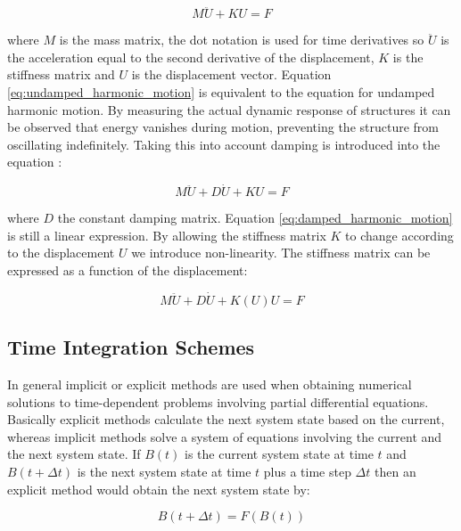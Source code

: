 \begin{equation}
\label{eq:undamped_harmonic_motion}
M \ddot{U} + K U = F
\end{equation}
  
where $M$ is the mass matrix, the dot notation is used for
time derivatives so $\ddot{U}$ is the acceleration equal
to the second derivative of the displacement, $K$ is the stiffness
matrix and $U$ is the displacement vector. Equation
\eqref{eq:undamped_harmonic_motion} is equivalent to the equation for
undamped harmonic motion. By measuring the actual dynamic response of
structures it can be observed that energy vanishes during motion,
preventing the structure from oscillating indefinitely. Taking this into
account damping is introduced into the equation : 

\begin{equation}
\label{eq:damped_harmonic_motion}
M \ddot{U} + D\dot{U} + K U = F
\end{equation}

where $D$ the constant damping matrix. Equation 
\eqref{eq:damped_harmonic_motion} is still a linear expression. 
By allowing the stiffness matrix $K$ to change according to the
displacement $U$ we introduce non-linearity. The stiffness matrix
can be expressed as a function of the displacement:

\begin{equation}
\label{eq:damped_harmonic_motion_nonlinear}
M\ddot{U} + D\dot{U} + K(U)U = F
\end{equation}

\subsection{Time Integration Schemes}
In general implicit or explicit methods are used when obtaining
numerical solutions to time-dependent problems involving partial
differential equations. Basically explicit methods calculate the next
system state based on the current, whereas implicit
methods solve a system of equations involving the current and the next system
state. If $B(t)$ is the current system state at time $t$ and 
$B(t + \Delta t)$ is the next system state at time $t$ plus a time
step $\Delta t$ then an explicit method would obtain the next 
system state by:

\begin{equation}
B(t + \Delta t) = F( B(t) )
\end{equation}


